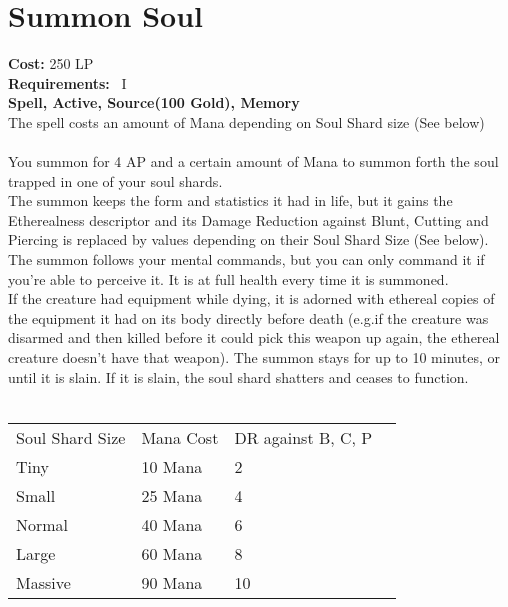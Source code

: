 \section{Summon Soul}\label{spell:summonSoul}
\textbf{Cost:} 250 LP\\
\textbf{Requirements:}~ I\\
\textbf{Spell, Active, Source(100 Gold), Memory}\\
The spell costs an amount of Mana depending on Soul Shard size (See below)\\
\\
You summon for 4 AP and a certain amount of Mana to summon forth the soul trapped in one of your soul shards.\\
The summon keeps the form and statistics it had in life, but it gains the Etherealness descriptor and its Damage Reduction against Blunt, Cutting and Piercing is replaced by values depending on their Soul Shard Size (See below).
The summon follows your mental commands, but you can only command it if you're able to perceive it.
It is at full health every time it is summoned.\\
If the creature had equipment while dying, it is adorned with ethereal copies of the equipment it had on its body directly before death (e.g.if the creature was disarmed and then killed before it could pick this weapon up again, the ethereal creature doesn't have that weapon).
The summon stays for up to 10 minutes, or until it is slain.
If it is slain, the soul shard shatters and ceases to function.\\
\\
\begin{longtable}{l | l | p{5.5cm} | p{2.5cm}}
    Soul Shard Size & Mana Cost & DR against B, C, P\\
    Tiny & 10 Mana & 2\\
    Small & 25 Mana & 4\\
    Normal & 40 Mana & 6\\
    Large & 60 Mana & 8\\
    Massive & 90 Mana & 10\\
\end{longtable}


